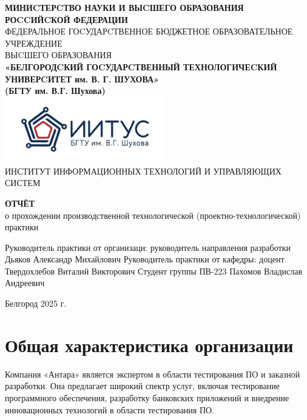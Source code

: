 \documentclass[a4paper,14pt]{extarticle}
\begin{document}
\thispagestyle{empty}
\linespread{1.5}
\justifying
\begin{center}
    \small{
        \textbf{МИНИCТЕРCТВО НАУКИ И ВЫCШЕГО ОБРАЗОВАНИЯ РОCCИЙCКОЙ ФЕДЕРАЦИИ}\\
        ФЕДЕРАЛЬНОЕ ГОCУДАРCТВЕННОЕ БЮДЖЕТНОЕ ОБРАЗОВАТЕЛЬНОЕ УЧРЕЖДЕНИЕ\\ВЫCШЕГО ОБРАЗОВАНИЯ \\
        \textbf{«БЕЛГОРОДCКИЙ ГОCУДАРCТВЕННЫЙ ТЕХНОЛОГИЧЕCКИЙ\\УНИВЕРCИТЕТ им. В. Г. ШУХОВА»\\ (БГТУ им. В.Г. Шухова)} \\
        \bigbreak
        \includegraphics[width=70mm]{log}\\
        ИНСТИТУТ ИНФОРМАЦИОННЫХ ТЕХНОЛОГИЙ И УПРАВЛЯЮЩИХ СИСТЕМ\\}
\end{center}

\vfill
\begin{center}
    \large{
        \textbf{
            ОТЧЁТ}}\\
    \normalsize{о прохождении производственной технологической (проектно-технологической) практики}
\end{center}
\vfill
\begin{center}
    Руководитель практики от организаци: руководитель направления разработки Дьяков Александр Михайлович\bigbreak
    Руководитель практики от кафедры: доцент Твердохлебов Виталий Викторович\bigbreak
    Студент группы ПВ-223 Пахомов Владислав Андреевич
\end{center}
\vfill\begin{center}
    Белгород 2025 г.
\end{center}
\newpage

\renewcommand{\contentsname}{Оглавление}
\thispagestyle{empty}
\tableofcontents
\newpage

\setlength{\parindent}{1.25cm}

\section{Общая характеристика организации}
Компания «Антара» является экспертом в области тестирования ПО и заказной разработки. 
Она предлагает широкий спектр услуг, включая тестирование программного обеспечения, 
разработку банковских приложений и внедрение инновационных технологий в области тестирования ПО.
\end{document}
